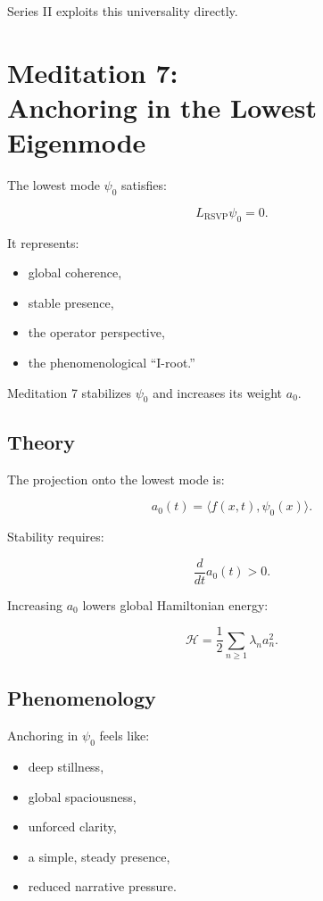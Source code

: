 \documentclass[12pt]{article}
\begin{document}
Series II exploits this universality directly.

\newpage

\chapter{Meditation 7:\\ Anchoring in the Lowest Eigenmode}

The lowest mode $\psi_0$ satisfies:

\[
L_{\text{RSVP}}\psi_0 = 0.
\]

It represents:

\begin{itemize}
    \item global coherence,
    \item stable presence,
    \item the operator perspective,
    \item the phenomenological ``I-root.''
\end{itemize}

Meditation 7 stabilizes $\psi_0$ and increases its weight $a_0$.

\section{Theory}

The projection onto the lowest mode is:

\[
a_0(t) = \langle f(x,t), \psi_0(x)\rangle.
\]

Stability requires:

\[
\frac{d}{dt} a_0(t) > 0.
\]

Increasing $a_0$ lowers global Hamiltonian energy:

\[
\mathcal{H}
    = \frac12 \sum_{n\ge1} \lambda_n a_n^2.
\]

\section{Phenomenology}

Anchoring in $\psi_0$ feels like:

\begin{itemize}
    \item deep stillness,
    \item global spaciousness,
    \item unforced clarity,
    \item a simple, steady presence,
    \item reduced narrative pressure.
\end{itemize}
\end{document}
